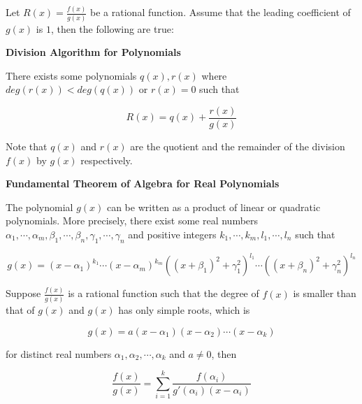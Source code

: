\documentclass[a4paper,12pt]{article}
\begin{document}
\begin{thm}
  Let $R(x)=\frac{f(x)}{g(x)}$ be a rational function. Assume that the leading coefficient of $g(x)$ is $1$, then the following are true:

  \begin{alist}
    \item \textbf{Division Algorithm for Polynomials}\n

    There exists some polynomials $q(x),r(x)$ where $deg(r(x))<deg(q(x))$ or $r(x)=0$ such that

    $$R(x)=q(x)+\frac{r(x)}{g(x)}$$\s

    Note that $q(x)$ and $r(x)$ are the quotient and the remainder of the division $f(x)$ by $g(x)$ respectively.

    \item \textbf{Fundamental Theorem of Algebra for Real Polynomials}\n

    The polynomial $g(x)$ can be written as a product of linear or quadratic polynomials. More precisely, there exist some real numbers $\alpha_{1},\cdots,\alpha_{m},\beta_{1},\cdots,\beta_{n},\gamma_{1},\cdots,\gamma_{n}$ and positive integers $k_{1},\cdots,k_{m},l_{1},\cdots,l_{n}$ such that

    $$g(x)=(x-\alpha_{1})^{k_{1}}\cdots(x-\alpha_{m})^{k_{m}}((x+\beta_{1})^{2}+\gamma_{1}^{2})^{l_{1}}\cdots((x+\beta_{n})^{2}+\gamma_{n}^{2})^{l_{n}}$$
  \end{alist}
\end{thm}\n

\begin{thm}
  Suppose $\frac{f(x)}{g(x)}$ is a rational function such that the degree of $f(x)$ is smaller than that of $g(x)$ and $g(x)$ has only simple roots, which is

  $$g(x)=a(x-\alpha_{1})(x-\alpha_{2})\cdots(x-\alpha_{k})$$\s

  for distinct real numbers $\alpha_{1},\alpha_{2},\cdots,\alpha_{k}$ and $a\neq 0$, then

  $$\frac{f(x)}{g(x)}=\sum_{i=1}^{k}\frac{f(\alpha_{i})}{g'(\alpha_{i})(x-\alpha_{i})}$$
\end{thm}

\pagebreak
\end{document}
